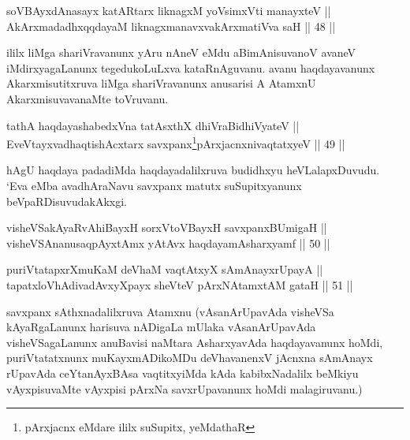 
\begin{shl}
soV\s BAyxdAnasayx katAR\s tarx liknagxM yoV\s simxVti manayxteV || \\
AkArxmadadhxqqdayaM liknagxmanavxvakArxmatiVva saH \hfill || 48 ||  
\end{shl}

\begin{artha}
ililx liMga shariVravanunx yAru nAneV eMdu aBimAnisuvanoV avaneV
iMdirxyagaLanunx tegedukoLuLxva kataRnAguvanu. avanu haqdayavanunx
Akarxmisutitxruva liMga shariVravanunx anusarisi A AtamxnU
AkarxmisuvavanaMte toVruvanu.
\end{artha}


\begin{shl}
tathA haqdayashabedxVna tatAsxthX dhiVraBidhiVyateV || \\
EveVtayxvadhaqtishAcxtarx savxpanx\footnote{pArxjacnx eMdare ililx suSupitx, yeMdathaR}pArxjacnxnivaqtatxyeV \hfill || 49 ||  
\end{shl}


\begin{artha}
hAgU haqdaya padadiMda haqdayadalilxruva budidhxyu heVLalapxDuvudu. `Eva eMba avadhAraNavu savxpanx matutx suSupitxyanunx beVpaRDisuvudakAkxgi.
\end{artha}


\begin{shl}
visheVSakAyaRvAhiBayxH sorxVtoVBayxH savxpanxBUmigaH || \\
visheVSAnanusaqpAyx\s \s tAmx yAtAvx haqdayamAsharxyamf \hfill || 50 || 
\end{shl}

\begin{shl}
puriVtatapxrXmuKaM deVhaM vaqtAtxyX sAmAnayxrUpayA || \\
tapatxloVhAdivadAvxyXpayx sheVteV pArxNAtamxtAM gataH \hfill || 51 ||  
\end{shl}

\begin{artha}
savxpanx sAthxnadalilxruva Atamxnu (vAsanArUpavAda visheVSa
kAyaRgaLanunx harisuva nADigaLa mUlaka vAsanArUpavAda visheVSagaLanunx
anuBavisi naMtara AsharxyavAda haqdayavanunx hoMdi, puriVtatatxnunx
muKayxmADikoMDu deVhavanenxV jAcnxna sAmAnayx rUpavAda ceYtanAyxBAsa
vaqtitxyiMda kAda kabibxNadalilx beMkiyu vAyxpisuvaMte vAyxpisi pArxNa
savxrUpavanunx hoMdi malagiruvanu.)
\end{artha}

